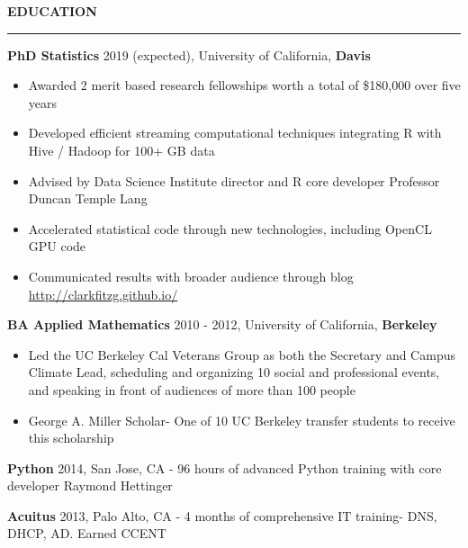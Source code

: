 \documentclass{article}
\begin{document}
\textbf{EDUCATION}
\vspace{0.2 cm}
\hrule
\vspace{0.1 cm}

\begin{description}

    \item \textbf{PhD Statistics}
    \hspace{.5cm}
        2019 (expected), University of California, \textbf{Davis}

\begin{itemize} 
    \item Awarded 2 merit based research fellowships worth a total of
        \$180,000 over five years
    \item Developed efficient streaming computational techniques
        integrating R with Hive / Hadoop for 100+ GB data
    \item Advised by Data Science Institute director and R core developer
        Professor Duncan Temple Lang
    \item Accelerated statistical code through new technologies, including
        OpenCL GPU code
    \item Communicated results with broader audience through blog
        \url{http://clarkfitzg.github.io/}
\end{itemize} 

\item \textbf{BA Applied Mathematics}
\hspace{.5cm}
2010 - 2012, University of California, \textbf{Berkeley}

\begin{itemize} 

\item Led the UC Berkeley Cal Veterans Group as both the Secretary and
    Campus Climate Lead, scheduling and organizing 10 social and
        professional events, and speaking in front of audiences of more
        than 100 people 

\item George A. Miller Scholar- One of 10 UC Berkeley transfer students to receive this scholarship

\end{itemize}

\item\textbf{Python}  \hspace{.5cm} 2014, San Jose, CA - 96 hours of advanced Python training with core
    developer Raymond Hettinger

\item\textbf{Acuitus}  \hspace{.5cm} 2013, Palo Alto, CA - 4 months of comprehensive IT training- DNS, DHCP, AD. Earned CCENT

\end{description}
\end{document}
